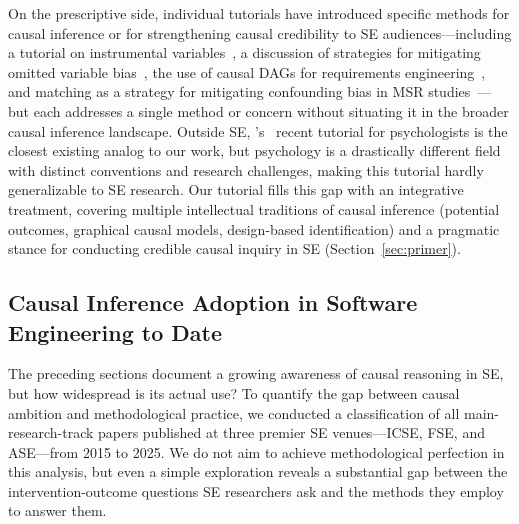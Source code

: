 On the prescriptive side, individual tutorials have introduced specific methods for causal inference or for strengthening causal credibility to SE audiences---including a tutorial on instrumental variables~\cite{DBLP:journals/tosem/GrafVlachyW24}, a discussion of strategies for mitigating omitted variable bias~\cite{DBLP:journals/corr/abs-2501-17026}, the use of causal DAGs for requirements engineering~\cite{DBLP:journals/corr/abs-2511-03875}, and matching as a strategy for mitigating confounding bias in MSR studies~\cite{DBLP:conf/msr/NoceraSLTV26}---but each addresses a single method or concern without situating it in the broader causal inference landscape.
Outside SE, \citeauthor{rohrer2024causal}'s~\cite{rohrer2024causal} recent tutorial for psychologists is the closest existing analog to our work, but psychology is a drastically different field with distinct conventions and research challenges, making this tutorial hardly generalizable to SE research.
Our tutorial fills this gap with an integrative treatment, covering multiple intellectual traditions of causal inference (potential outcomes, graphical causal models, design-based identification) and a pragmatic stance for conducting credible causal inquiry in SE (Section~\ref{sec:primer}).

\subsection{Causal Inference Adoption in Software Engineering to Date}
\label{sec:bg-adoption}

The preceding sections document a growing awareness of causal reasoning in SE, but how widespread is its actual use?
To quantify the gap between causal ambition and methodological practice, we conducted a classification of all main-research-track papers published at three premier SE venues---ICSE, FSE, and ASE---from 2015 to 2025.
We do not aim to achieve methodological perfection in this analysis, but even a simple exploration reveals a substantial gap between the intervention-outcome questions SE researchers ask and the methods they employ to answer them.

